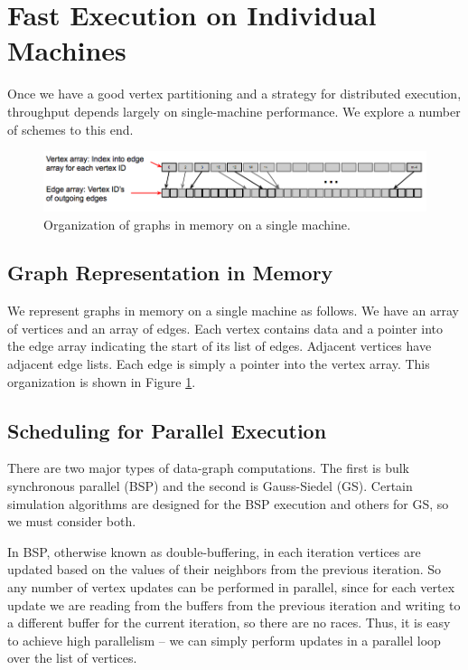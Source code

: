 \documentclass[journal]{IEEEtran}
\begin{document}
\section{Fast Execution on Individual Machines}

Once we have a good vertex partitioning and a strategy for distributed execution, throughput depends largely on single-machine performance. We explore a number of schemes to this end.

\begin{figure}[ht]
\centering
\includegraphics[width=\textwidth,keepaspectratio]{layout}
\caption{Organization of graphs in memory on a single machine.}
\label{fig_layout}
\end{figure}

\subsection{Graph Representation in Memory}
We represent graphs in memory on a single machine as follows. We have an array of vertices and an array of edges. Each vertex contains data and a pointer into the edge array indicating the start of its list of edges. Adjacent vertices have adjacent edge lists. Each edge is simply a pointer into the vertex array. This organization is shown in Figure \ref{fig_layout}.

\subsection{Scheduling for Parallel Execution}
There are two major types of data-graph computations. The first is bulk synchronous parallel (BSP) and the second is Gauss-Siedel (GS). Certain simulation algorithms are designed for the BSP execution and others for GS, so we must consider both.

In BSP, otherwise known as double-buffering, in each iteration vertices are updated based on the values of their neighbors from the previous iteration. So any number of vertex updates can be performed in parallel, since for each vertex update we are reading from the buffers from the previous iteration and writing to a different buffer for the current iteration, so there are no races. Thus, it is easy to achieve high parallelism -- we can simply perform updates in a parallel loop over the list of vertices.
\end{document}
